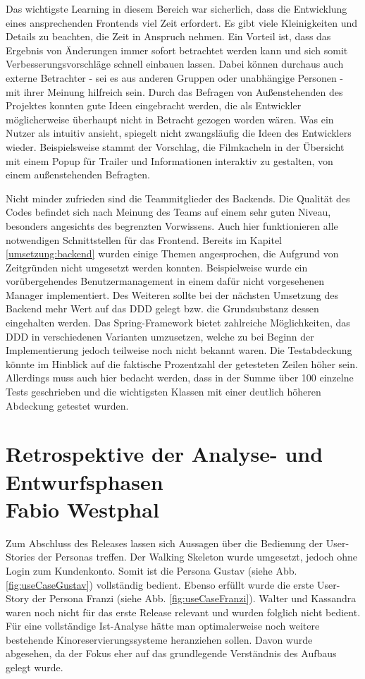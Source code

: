 		Das wichtigste Learning in diesem Bereich war sicherlich, dass die Entwicklung eines ansprechenden Frontends viel Zeit erfordert. Es gibt viele Kleinigkeiten und Details zu beachten, die Zeit in Anspruch nehmen. Ein Vorteil ist, dass das Ergebnis von Änderungen immer sofort betrachtet werden kann und sich somit Verbesserungsvorschläge schnell einbauen lassen. Dabei können durchaus auch externe Betrachter - sei es aus anderen Gruppen oder unabhängige Personen - mit ihrer Meinung hilfreich sein. Durch das Befragen von Außenstehenden des Projektes konnten gute Ideen eingebracht werden, die als Entwickler möglicherweise überhaupt nicht in Betracht gezogen worden wären. Was ein Nutzer als intuitiv ansieht, spiegelt nicht zwangsläufig die Ideen des Entwicklers wieder. Beispielsweise stammt der Vorschlag, die Filmkacheln in der Übersicht mit einem Popup für Trailer und Informationen interaktiv zu gestalten, von einem außenstehenden Befragten. 
	
		Nicht minder zufrieden sind die Teammitglieder des Backends. Die Qualität des Codes befindet sich nach Meinung des Teams auf einem sehr guten Niveau, besonders angesichts des begrenzten Vorwissens. Auch hier funktionieren alle notwendigen Schnittstellen für das Frontend.
		Bereits im Kapitel \ref{umsetzung:backend} wurden einige Themen angesprochen, die Aufgrund von Zeitgründen nicht umgesetzt werden konnten. Beispielweise wurde ein vorübergehendes Benutzermanagement in einem dafür nicht vorgesehenen Manager implementiert. Des Weiteren sollte bei der nächsten Umsetzung des Backend mehr Wert auf das \ac{DDD} gelegt bzw. die Grundsubstanz dessen eingehalten werden. Das Spring-Framework bietet zahlreiche Möglichkeiten, das \ac{DDD} in verschiedenen Varianten umzusetzen, welche zu bei Beginn der Implementierung jedoch teilweise noch nicht bekannt waren. Die Testabdeckung könnte im Hinblick auf die faktische Prozentzahl der getesteten Zeilen höher sein. Allerdings muss auch hier bedacht werden, dass in der Summe über 100 einzelne Tests geschrieben und die wichtigsten Klassen mit einer deutlich höheren Abdeckung getestet wurden.
		\newpage
\section[Retrospektive der Analyse- und Entwurfsphasen]{Retrospektive der Analyse- und Entwurfsphasen\\{\hfill \normalsize Fabio Westphal}}
		Zum Abschluss des Releases lassen sich Aussagen über die Bedienung der User-Stories der Personas treffen. Der Walking Skeleton wurde umgesetzt, jedoch ohne Login zum Kundenkonto. Somit ist die Persona Gustav (siehe Abb. \ref{fig:useCaseGustav}) vollständig bedient. Ebenso erfüllt wurde die erste User-Story der Persona Franzi (siehe Abb. \ref{fig:useCaseFranzi}). Walter und Kassandra waren noch nicht für das erste Release relevant und wurden folglich nicht bedient.
		Für eine vollständige Ist-Analyse hätte man optimalerweise noch weitere bestehende Kinoreservierungssysteme heranziehen sollen. Davon wurde abgesehen, da der Fokus eher auf das grundlegende Verständnis des Aufbaus gelegt wurde.

